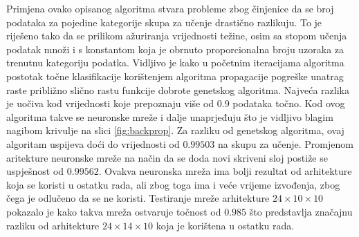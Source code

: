 \documentclass[times, utf8, zavrsni, numeric]{fer}
\begin{document}
Primjena ovako opisanog algoritma stvara probleme zbog činjenice da se broj podataka za pojedine kategorije skupa za učenje drastično razlikuju.
To je riješeno tako da se prilikom ažuriranja vrijednosti težine, osim sa stopom učenja podatak množi i s konstantom koja je obrnuto proporcionalna broju uzoraka za trenutnu kategoriju podatka.
Vidljivo je kako u početnim iteracijama algoritma postotak točne klasifikacije korištenjem algoritma propagacije pogreške unatrag raste približno slično rastu funkcije dobrote genetskog algoritma.
Najveća razlika je uočiva kod vrijednosti koje prepoznaju više od $0.9$ podataka točno.
Kod ovog algoritma takve se neuronske mreže i dalje unaprjeđuju što je vidljivo blagim nagibom krivulje na slici \ref{fig:backprop}.
Za razliku od genetskog algoritma, ovaj algoritam uspijeva doći do vrijednosti od $0.99503$ na skupu za učenje.
Promjenom aritekture neuronske mreže na način da se doda novi skriveni sloj postiže se uspješnost od $0.99562$.
Ovakva neuronska mreža ima bolji rezultat od arhitekture koja se koristi u ostatku rada, ali zbog toga ima i veće vrijeme izvođenja, zbog čega je odlučeno da se ne koristi.
Testiranje mreže arhitekture $24\times10\times10$ pokazalo je kako takva mreža ostvaruje točnost od $0.985$ što predstavlja značajnu razliku od arhitekture $24\times14\times10$ koja je korištena u ostatku rada.
\end{document}
